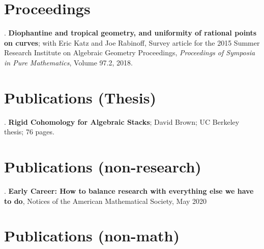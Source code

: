 \documentclass[margin,line]{res}
\newcounter{pubs}
\begin{document}
\begin{resume}
\vspace{-7pt}
\section{\sc Proceedings }
 . \textbf{Diophantine and tropical geometry, and uniformity of   rational points on curves}; with Eric Katz and Joe Rabinoff, Survey article for the 2015 Summer Research Institute on Algebraic Geometry Proceedings, \emph{Proceedings of Symposia in Pure Mathematics}, Volume 97.2, 2018. \vspace{.08cm}\\



\section{\sc Publications {(Thesis)}}
 . \textbf{Rigid Cohomology for Algebraic Stacks}; David Brown; UC Berkeley thesis; 76 pages. \vspace{.08cm}\\




\section{\sc Publications (non-research)}
 . \textbf{Early Career: How to balance research with everything else we have to do}, Notices of the American Mathematical Society, May 2020



\section{\sc Publications (non-math)}


\end{resume}
\end{document}
